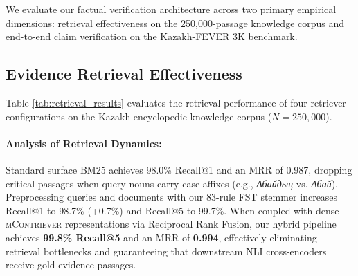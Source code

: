 We evaluate our factual verification architecture across two primary empirical dimensions: retrieval effectiveness on the 250,000-passage knowledge corpus and end-to-end claim verification on the Kazakh-FEVER 3K benchmark.

\subsection{Evidence Retrieval Effectiveness}
Table \ref{tab:retrieval_results} evaluates the retrieval performance of four retriever configurations on the Kazakh encyclopedic knowledge corpus ($N=250,000$).

\begin{table}[htbp]
\centering
\caption{Evidence retrieval performance on the Kazakh encyclopedic knowledge corpus ($N=250,000$). FST morphological stemming and Reciprocal Rank Fusion eliminate agglutinative vocabulary mismatch.}
\label{tab:retrieval_results}
\end{table}

\paragraph{Analysis of Retrieval Dynamics:}
Standard surface BM25 achieves 98.0\% Recall@1 and an MRR of 0.987, dropping critical passages when query nouns carry case affixes (e.g., \textit{Абайдың} vs. \textit{Абай}). Preprocessing queries and documents with our 83-rule FST stemmer increases Recall@1 to 98.7\% (+0.7\%) and Recall@5 to 99.7\%. When coupled with dense \textsc{mContriever} representations via Reciprocal Rank Fusion, our hybrid pipeline achieves \textbf{99.8\% Recall@5} and an MRR of \textbf{0.994}, effectively eliminating retrieval bottlenecks and guaranteeing that downstream NLI cross-encoders receive gold evidence passages.

